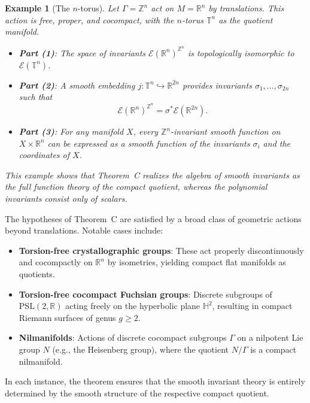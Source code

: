\documentclass[]{article}
\newtheorem{example}[theorem]{Example}
\begin{document}
\begin{example}[The $n$-torus]
	Let $\Gamma = \mathbb{Z}^n$ act on $M = \mathbb{R}^n$ by translations. This action is free, proper, and cocompact, with the $n$-torus $\mathbb{T}^n$ as the quotient manifold.
	
	\begin{itemize}
		\item \textbf{Part (1)}: The space of invariants $\mathcal{E}(\mathbb{R}^n)^{\mathbb{Z}^n}$ is topologically isomorphic to $\mathcal{E}(\mathbb{T}^n)$.
		\item \textbf{Part (2)}: A smooth embedding $j: \mathbb{T}^n \hookrightarrow \mathbb{R}^{2n}$ provides invariants $\sigma_1, \ldots, \sigma_{2n}$ such that
		\[
		\mathcal{E}(\mathbb{R}^n)^{\mathbb{Z}^n} = \sigma^*\mathcal{E}(\mathbb{R}^{2n}).
		\]
		\item \textbf{Part (3)}: For any manifold $X$, every $\mathbb{Z}^n$-invariant smooth function on $X \times \mathbb{R}^n$ can be expressed as a smooth function of the invariants $\sigma_i$ and the coordinates of $X$.
	\end{itemize}
	
This example shows that Theorem~C realizes the algebra of smooth invariants as the full function theory of the compact quotient, whereas the polynomial invariants consist only of scalars.
\end{example}

The hypotheses of Theorem~C are satisfied by a broad class of geometric actions beyond translations. Notable cases include:
\begin{itemize}
		\item \textbf{Torsion-free crystallographic groups}: These act properly discontinuously and cocompactly on $\mathbb{R}^n$ by isometries, yielding compact flat manifolds as quotients.
		\item \textbf{Torsion-free cocompact Fuchsian groups}: Discrete subgroups of $\mathrm{PSL}(2,\mathbb{R})$ acting freely on the hyperbolic plane $\mathbb{H}^2$, resulting in compact Riemann surfaces of genus $g \geq 2$.
		\item \textbf{Nilmanifolds}: Actions of discrete cocompact subgroups $\Gamma$ on a nilpotent Lie group $N$ (e.g., the Heisenberg group), where the quotient $N/\Gamma$ is a compact nilmanifold.
\end{itemize}

In each instance, the theorem ensures that the smooth invariant theory is entirely determined by the smooth structure of the respective compact quotient.
\end{document}
